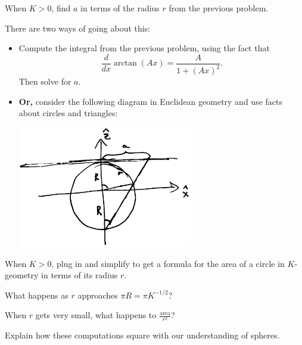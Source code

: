 \documentclass[newpage,hints,handout]{ximera}
\begin{document}
\begin{problem}
  When $K>0$, find $a$ in terms of the radius $r$ from the previous problem.
  \begin{hint}
    There are two ways of going about this:
    \begin{itemize}
    \item Compute the integral from the previous problem, using the fact that
      \[\frac{d}{dx}\arctan(Ax)=\frac{A}{1+(Ax)^2}.\]
      Then solve for $a$.
    \item \textbf{Or,} consider the following diagram in Euclidean geometry and
      use facts about circles and triangles:
      \begin{image}
        \includegraphics[width=3in]{stereoSphere.png}
      \end{image}
    \end{itemize}
  \end{hint}
\end{problem}

\begin{problem}
  When $K>0$, plug in and simplify to get a formula for the area of a circle in
  $K$-geometry in terms of its radius $r$.
\end{problem}

\begin{problem}
  What happens as $r$ approaches $\pi R=\pi K^{-1/2}$?

  When $r$ gets very small, what happens to $\frac{\text{area}}{r^2}$?

  Explain how these computations square with our understanding of spheres.
\end{problem}
\end{document}
